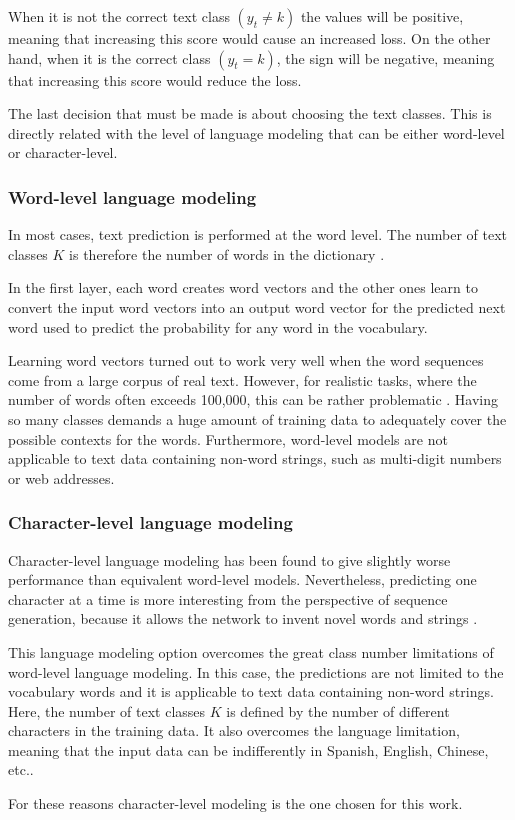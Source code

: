 When it is not the correct text class $(y_t \not= k)$ the values will be positive, meaning that increasing this score would cause an increased loss. On the other hand, when it is the correct class $(y_t = k)$, the sign will be negative, meaning that increasing this score would reduce the loss.

The last decision that must be made is about choosing the text classes. This is directly related with the level of language modeling that can be either word-level or character-level.

\subsubsection{Word-level language modeling}

In most cases, text prediction is performed at the word level. The number of text classes $K$ is therefore the number of words in the dictionary \cite{graves2013generating}.

In the first layer, each word creates word vectors and the other ones learn to convert the input word vectors into an output word vector for the predicted next word used to predict the probability for any word in the vocabulary. 

Learning word vectors turned out to work very well when the word sequences come from a large corpus of real text. However, for realistic tasks, where the number of words often exceeds 100,000, this can be rather problematic \cite{lecun2015deep}. 
 Having so many classes demands a huge amount of training data to adequately cover the possible contexts for the words. Furthermore, word-level models are not applicable to text data containing non-word strings, such as multi-digit numbers or web addresses.\cite{graves2013generating}

\subsubsection{Character-level language modeling}

Character-level language modeling has been found to give slightly worse performance than equivalent word-level models. Nevertheless, predicting one character at a time is more interesting from the perspective of sequence generation, because it allows the network to invent novel words and strings \cite{graves2013generating}. 

This language modeling option overcomes the great class number limitations of word-level language modeling. In this case, the predictions are not limited to the vocabulary words and it is applicable to text data containing non-word strings. Here, the number of text classes $K$ is defined by the number of different characters in the training data. It also overcomes the language limitation, meaning that the input data can be indifferently in Spanish, English, Chinese, etc.. 

For these reasons character-level modeling is the one chosen for this work.

 



